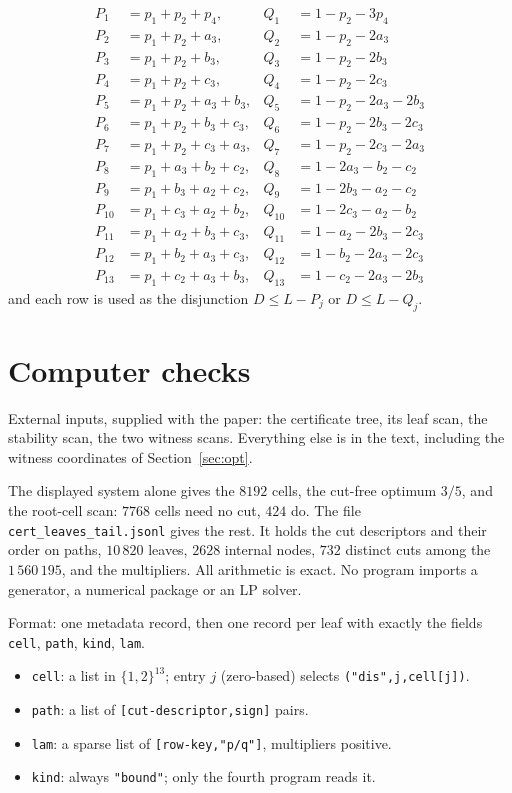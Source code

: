 \documentclass{amsart}
\numberwithin{equation}{section}
\numberwithin{table}{section}
\begin{document}
\begin{align}
 P_1&=p_1+p_2+p_4,& Q_1&=1-p_2-3p_4
 \tag{G1}\label{eq:G1}\\
 P_2&=p_1+p_2+a_3,& Q_2&=1-p_2-2a_3
 \tag{G2}\label{eq:G2}\\
 P_3&=p_1+p_2+b_3,& Q_3&=1-p_2-2b_3
 \tag{G3}\label{eq:G3}\\
 P_4&=p_1+p_2+c_3,& Q_4&=1-p_2-2c_3
 \tag{G4}\label{eq:G4}\\
 P_5&=p_1+p_2+a_3+b_3,& Q_5&=1-p_2-2a_3-2b_3
 \tag{G5}\label{eq:G5}\\
 P_6&=p_1+p_2+b_3+c_3,& Q_6&=1-p_2-2b_3-2c_3
 \tag{G6}\label{eq:G6}\\
 P_7&=p_1+p_2+c_3+a_3,& Q_7&=1-p_2-2c_3-2a_3
 \tag{G7}\label{eq:G7}\\
 P_8&=p_1+a_3+b_2+c_2,& Q_8&=1-2a_3-b_2-c_2
 \tag{G8}\label{eq:G8}\\
 P_9&=p_1+b_3+a_2+c_2,& Q_9&=1-2b_3-a_2-c_2
 \tag{G9}\label{eq:G9}\\
 P_{10}&=p_1+c_3+a_2+b_2,& Q_{10}&=1-2c_3-a_2-b_2
 \tag{G10}\label{eq:G10}\\
 P_{11}&=p_1+a_2+b_3+c_3,& Q_{11}&=1-a_2-2b_3-2c_3
 \tag{G11}\label{eq:G11}\\
 P_{12}&=p_1+b_2+a_3+c_3,& Q_{12}&=1-b_2-2a_3-2c_3
 \tag{G12}\label{eq:G12}\\
 P_{13}&=p_1+c_2+a_3+b_3,& Q_{13}&=1-c_2-2a_3-2b_3
 \tag{G13}\label{eq:G13}
\end{align}
and each row is used as the disjunction
$D\le L-P_j$ or $D\le L-Q_j$.

\section{Computer checks}\label{app:ver}

External inputs, supplied with the paper: the certificate tree, its leaf
scan, the stability scan, the two witness scans. Everything else is in the
text, including the witness coordinates of Section~\ref{sec:opt}.

The displayed system alone gives the $8192$ cells, the cut-free optimum
$3/5$, and the root-cell scan: $7768$ cells need no cut, $424$ do. The file
\texttt{cert\_leaves\_tail.jsonl} gives the rest. It holds the cut descriptors
and their order on paths, $10\,820$ leaves, $2628$ internal nodes, $732$
distinct cuts among the $1\,560\,195$, and the multipliers. All
arithmetic is exact. No program imports a generator, a numerical package or an
LP solver.

Format: one metadata record, then one record per leaf with exactly the
fields \texttt{cell}, \texttt{path}, \texttt{kind}, \texttt{lam}.
\begin{itemize}
\item \texttt{cell}: a list in $\{1,2\}^{13}$; entry $j$ (zero-based) selects
 \texttt{("dis",j,cell[j])}.
\item \texttt{path}: a list of \texttt{[cut-descriptor,sign]} pairs.
\item \texttt{lam}: a sparse list of \texttt{[row-key,"p/q"]}, multipliers
 positive.
\item \texttt{kind}: always \texttt{"bound"}; only the fourth program reads it.
\end{itemize}
\end{document}
